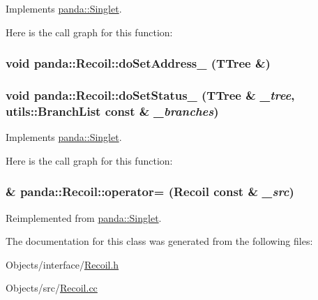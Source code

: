 Implements \hyperlink{classpanda_1_1Singlet_ad5acaa19bf3a8c360cf2e36604ab4530}{panda::Singlet}.

Here is the call graph for this function:\hypertarget{classpanda_1_1Recoil_a5e8d6c728a38c695643399c984eff1de}{
\subsubsection[{doSetAddress\_\-}]{\setlength{\rightskip}{0pt plus 5cm}void panda::Recoil::doSetAddress\_\- (TTree \&)}}
\label{classpanda_1_1Recoil_a5e8d6c728a38c695643399c984eff1de}
\hypertarget{classpanda_1_1Recoil_a68fa34c56d13dae0010ad93e1092ca4f}{
\subsubsection[{doSetStatus\_\-}]{\setlength{\rightskip}{0pt plus 5cm}void panda::Recoil::doSetStatus\_\- (TTree \& {\em \_\-tree}, \/  {\bf utils::BranchList} const \& {\em \_\-branches})}}
\label{classpanda_1_1Recoil_a68fa34c56d13dae0010ad93e1092ca4f}


Implements \hyperlink{classpanda_1_1Singlet_a660799e379f7949f3b8e2d74f6e1ddb2}{panda::Singlet}.

Here is the call graph for this function:\hypertarget{classpanda_1_1Recoil_a4915faccef273487495e3ec4a0c8176a}{
\subsubsection[{operator=}]{ \& panda::Recoil::operator= ({\bf Recoil} const \& {\em \_\-src})}}
\label{classpanda_1_1Recoil_a4915faccef273487495e3ec4a0c8176a}


Reimplemented from \hyperlink{classpanda_1_1Singlet_a161b3df14c430fd7f1afdd64d098b211}{panda::Singlet}.

The documentation for this class was generated from the following files:\begin{DoxyCompactItemize}
\item 
Objects/interface/\hyperlink{Recoil_8h}{Recoil.h}\item 
Objects/src/\hyperlink{Recoil_8cc}{Recoil.cc}\end{DoxyCompactItemize}
